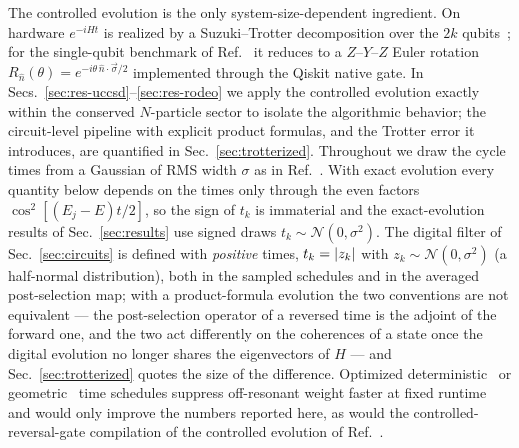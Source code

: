 \documentclass[
  aps,            %
  prc,            %
  reprint,        %
  superscriptaddress,
  floatfix,
  nofootinbib
]{revtex4-2}
\begin{document}
The controlled evolution is the only system-size-dependent ingredient.  On hardware
$e^{-iH t}$ is realized by a Suzuki--Trotter decomposition over the $2k$
qubits~\cite{Trotter1959,Suzuki1976,Childs2021}; for the single-qubit benchmark of
Ref.~\cite{Qian2024} it reduces to a $Z$--$Y$--$Z$ Euler rotation
$R_{\hat n}(\theta)=e^{-i\theta\,\hat n\cdot\vec\sigma/2}$ implemented through the
Qiskit native gate.  In Secs.~\ref{sec:res-uccsd}--\ref{sec:res-rodeo} we apply the
controlled evolution exactly within the conserved $N$-particle sector to isolate the
algorithmic behavior; the circuit-level pipeline with explicit product formulas,
and the Trotter error it introduces, are quantified in Sec.~\ref{sec:trotterized}.
Throughout we draw the cycle times from a Gaussian of RMS width $\sigma$ as
in Ref.~\cite{Choi2021}.  With exact evolution every quantity below depends
on the times only through the even factors $\cos^2[(E_j-E)t/2]$, so the
sign of $t_k$ is immaterial and the exact-evolution results of
Sec.~\ref{sec:results} use signed draws $t_k\sim\mathcal N(0,\sigma^2)$.
The digital filter of Sec.~\ref{sec:circuits} is defined with
\emph{positive} times, $t_k=\abs{z_k}$ with $z_k\sim\mathcal N(0,\sigma^2)$
(a half-normal distribution), both in the sampled schedules and in the
averaged post-selection map; with a product-formula evolution the two
conventions are not equivalent --- the post-selection operator of a reversed
time is the adjoint of the forward one, and the two act differently on the
coherences of a state once the digital evolution no longer shares the
eigenvectors of $H$ --- and Sec.~\ref{sec:trotterized} quotes the size of the
difference.
Optimized deterministic~\cite{Cohen2023} or
geometric~\cite{Patkowski2026} time schedules suppress off-resonant weight faster
at fixed runtime and would only improve the numbers reported here, as would the
controlled-reversal-gate compilation of the controlled evolution of
Ref.~\cite{BeeLindgren2022}.
\end{document}
